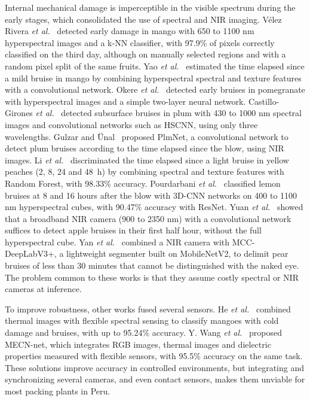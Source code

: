 \documentclass[journal]{IEEEtran}
\begin{document}
Internal mechanical damage is imperceptible in the visible spectrum during the early stages, which consolidated the use of spectral and NIR imaging. V\'elez Rivera \emph{et al.}~\cite{velez2014} detected early damage in mango with 650 to 1100 nm hyperspectral images and a k-NN classifier, with 97.9\% of pixels correctly classified on the third day, although on manually selected regions and with a random pixel split of the same fruits. Yao \emph{et al.}~\cite{yao2024} estimated the time elapsed since a mild bruise in mango by combining hyperspectral spectral and texture features with a convolutional network. Okere \emph{et al.}~\cite{okere2023} detected early bruises in pomegranate with hyperspectral images and a simple two-layer neural network. Castillo-Girones \emph{et al.}~\cite{castillo2024} detected subsurface bruises in plum with 430 to 1000 nm spectral images and convolutional networks such as HSCNN, using only three wavelengths. Gulzar and \"Unal~\cite{gulzar2025} proposed PlmNet, a convolutional network to detect plum bruises according to the time elapsed since the blow, using NIR images. Li \emph{et al.}~\cite{li2023} discriminated the time elapsed since a light bruise in yellow peaches (2, 8, 24 and 48~h) by combining spectral and texture features with Random Forest, with 98.33\% accuracy. Pourdarbani \emph{et al.}~\cite{pourdarbani2023} classified lemon bruises at 8 and 16 hours after the blow with 3D-CNN networks on 400 to 1100 nm hyperspectral cubes, with 90.47\% accuracy with ResNet. Yuan \emph{et al.}~\cite{yuan2022} showed that a broadband NIR camera (900 to 2350 nm) with a convolutional network suffices to detect apple bruises in their first half hour, without the full hyperspectral cube. Yan \emph{et al.}~\cite{yan2025} combined a NIR camera with MCC-DeepLabV3+, a lightweight segmenter built on MobileNetV2, to delimit pear bruises of less than 30 minutes that cannot be distinguished with the naked eye. The problem common to these works is that they assume costly spectral or NIR cameras at inference.

To improve robustness, other works fused several sensors. He \emph{et al.}~\cite{he2025} combined thermal images with flexible spectral sensing to classify mangoes with cold damage and bruises, with up to 95.24\% accuracy. Y. Wang \emph{et al.}~\cite{wang2025} proposed MECN-net, which integrates RGB images, thermal images and dielectric properties measured with flexible sensors, with 95.5\% accuracy on the same task. These solutions improve accuracy in controlled environments, but integrating and synchronizing several cameras, and even contact sensors, makes them unviable for most packing plants in Peru.
\end{document}
